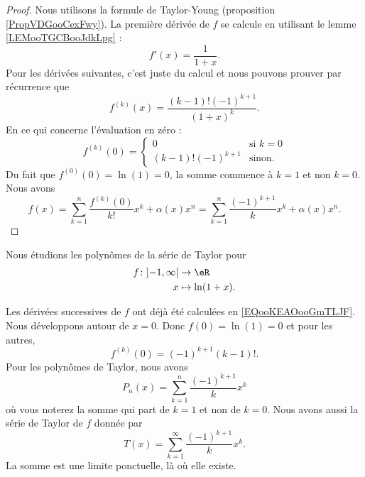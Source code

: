 \begin{proof}
    Nous utilisons la formule de Taylor-Young (proposition \ref{PropVDGooCexFwy}). La première dérivée de \( f\) se calcule en utilisant le lemme \ref{LEMooTGCBooJdkLpg} :
    \begin{equation}
        f'(x)=\frac{1}{ 1+x }.
    \end{equation}
    Pour les dérivées suivantes, c'est juste du calcul et nous pouvons prouver par récurrence que
    \begin{equation}        \label{EQooKEAOooGmTLJF}
        f^{(k)}(x)=\frac{ (k-1)!(-1)^{k+1} }{ (1+x)^k }.
    \end{equation}
    En ce qui concerne l'évaluation en zéro :
    \begin{equation}
        f^{(k)}(0)=\begin{cases}
            0    &   \text{si } k=0\\
            (k-1)!(-1)^{k+1}    &    \text{sinon.}
        \end{cases}
    \end{equation}
    Du fait que \( f^{(0)}(0)=\ln(1)=0\), la somme commence à \( k=1\) et non \( k=0\). Nous avons
    \begin{equation}
        f(x)=\sum_{k=1}^{n}\frac{ f^{(k)}(0) }{ k! }x^k+\alpha(x)x^n=\sum_{k=1}^n\frac{ (-1)^{k+1} }{ k }x^k+\alpha(x)x^n.
    \end{equation}
\end{proof}

Nous étudions les polynômes de la série de Taylor pour
\begin{equation}
    \begin{aligned}
    f\colon \mathopen] -1 , \infty \mathclose[&\to \eR \\
        x&\mapsto \ln(1+x). 
    \end{aligned}
\end{equation}

Les dérivées successives de \( f\) ont déjà été calculées en \eqref{EQooKEAOooGmTLJF}. Nous développons autour de \( x=0\). Donc \( f(0)=\ln(1)=0\) et pour les autres,
\begin{equation}
    f^{(k)}(0)=(-1)^{k+1}(k-1)!.
\end{equation}
Pour les polynômes de Taylor, nous avons
\begin{equation}
    P_n(x)=\sum_{k=1}^n\frac{ (-1)^{k+1} }{ k }x^k
\end{equation}
où vous noterez la somme qui part de \( k=1\) et non de \( k=0\). Nous avons aussi la série de Taylor de \( f\) donnée par
\begin{equation}        \label{EQooTAREooKfpTPo}
    T(x)=\sum_{k=1}^{\infty}\frac{ (-1)^{k+1} }{ k }x^k.
\end{equation}
La somme est une limite ponctuelle, là où elle existe.

